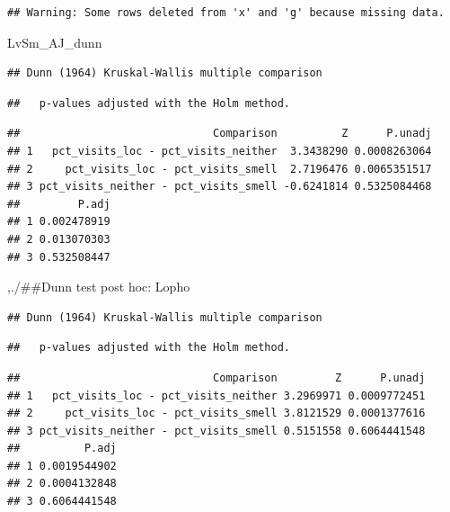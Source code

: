 \documentclass[]{article}
\newenvironment{Shaded}{\begin{snugshade}}{\end{snugshade}}
\newcommand{\KeywordTok}[1]{\textcolor[rgb]{0.13,0.29,0.53}{\textbf{{#1}}}}
\newcommand{\DataTypeTok}[1]{\textcolor[rgb]{0.13,0.29,0.53}{{#1}}}
\newcommand{\StringTok}[1]{\textcolor[rgb]{0.31,0.60,0.02}{{#1}}}
\newcommand{\OtherTok}[1]{\textcolor[rgb]{0.56,0.35,0.01}{{#1}}}
\newcommand{\NormalTok}[1]{{#1}}
\begin{document}
\begin{verbatim}
## Warning: Some rows deleted from 'x' and 'g' because missing data.
\end{verbatim}

\begin{Shaded}
\begin{Highlighting}[]
\NormalTok{LvSm_AJ_dunn}
\end{Highlighting}
\end{Shaded}

\begin{verbatim}
## Dunn (1964) Kruskal-Wallis multiple comparison
\end{verbatim}

\begin{verbatim}
##   p-values adjusted with the Holm method.
\end{verbatim}

\begin{verbatim}
##                              Comparison          Z      P.unadj
## 1   pct_visits_loc - pct_visits_neither  3.3438290 0.0008263064
## 2     pct_visits_loc - pct_visits_smell  2.7196476 0.0065351517
## 3 pct_visits_neither - pct_visits_smell -0.6241814 0.5325084468
##         P.adj
## 1 0.002478919
## 2 0.013070303
## 3 0.532508447
\end{verbatim}

,./\#\#Dunn test post hoc: Lopho

\begin{Shaded}
\end{Shaded}

\begin{verbatim}
## Dunn (1964) Kruskal-Wallis multiple comparison
\end{verbatim}

\begin{verbatim}
##   p-values adjusted with the Holm method.
\end{verbatim}

\begin{verbatim}
##                              Comparison         Z      P.unadj
## 1   pct_visits_loc - pct_visits_neither 3.2969971 0.0009772451
## 2     pct_visits_loc - pct_visits_smell 3.8121529 0.0001377616
## 3 pct_visits_neither - pct_visits_smell 0.5151558 0.6064441548
##          P.adj
## 1 0.0019544902
## 2 0.0004132848
## 3 0.6064441548
\end{verbatim}
\end{document}
